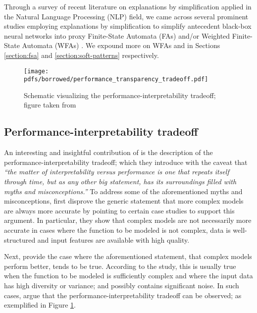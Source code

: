 Through a survey of recent literature on explanations by simplification applied
in the Natural Language Processing (NLP) field, we came across several prominent
studies employing explanations by simplification to simplify antecedent
black-box neural networks into proxy Finite-State Automata (FAs) and/or Weighted
Finite-State Automata (WFAs)
\citep{schwartz2018sopa,peng2018rational,suresh-etal-2019-distilling,wang2019state,jiang2020cold}.
We expound more on WFAs and \citet{schwartz2018sopa} in Sections
\ref{section:fsa} and \ref{section:soft-patterns} respectively.

\begin{figure}[t]
  \centering
  \texttt{[image: pdfs/borrowed/performance\_transparency\_tradeoff.pdf]}
  \caption{Schematic visualizing the performance-interpretability tradeoff;
    figure taken from \citet{arrieta2020explainable}}
  \label{fig:performance_interpretability_tradeoff}
\end{figure}

\subsection{Performance-interpretability tradeoff}

An interesting and insightful contribution of \citet[Page 18, Section
5.1]{arrieta2020explainable} is the description of the
performance-interpretability tradeoff; which they introduce with the caveat that
\textit{``the matter of interpretability versus performance is one that repeats
  itself through time, but as any other big statement, has its surroundings
  filled with myths and misconceptions.''} To address some of the aforementioned
myths and misconceptions, \citet{arrieta2020explainable} first disprove the
generic statement that more complex models are always more accurate by pointing
to certain case studies to support this argument. In particular, they show that
complex models are not necessarily more accurate in cases where the function to
be modeled is not complex, data is well-structured and input features are
available with high quality.

Next, \citet{arrieta2020explainable} provide the case where the aforementioned
statement, that complex models perform better, tends to be true. According to
the study, this is usually true when the function to be modeled is sufficiently
complex and where the input data has high diversity or variance; and possibly
contains significant noise. In such cases, \citet{arrieta2020explainable} argue
that the performance-interpretability tradeoff can be observed; as exemplified
in Figure \ref{fig:performance_interpretability_tradeoff}.
 
